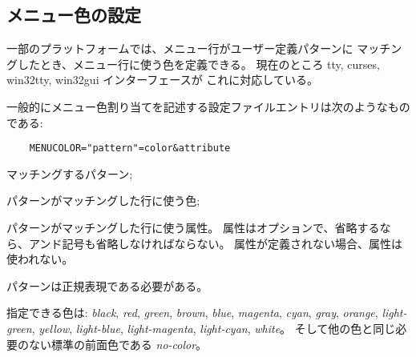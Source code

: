 
\subsection*{メニュー色の設定}

一部のプラットフォームでは、メニュー行がユーザー定義パターンに
マッチングしたとき、メニュー行に使う色を定義できる。
現在のところ tty, curses, win32tty, win32gui インターフェースが
これに対応している。

一般的にメニュー色割り当てを記述する設定ファイルエントリは次のようなものである:
\begin{verbatim}
    MENUCOLOR="pattern"=color&attribute
\end{verbatim}

\blist{}
\item[\ib{pattern}]
マッチングするパターン;
\item[\ib{color}]
パターンがマッチングした行に使う色;
\item[\ib{attribute}]
パターンがマッチングした行に使う属性。
属性はオプションで、省略するなら、アンド記号も省略しなければならない。
属性が定義されない場合、属性は使われない。
\elist

パターンは正規表現である必要がある。

指定できる色は:
{\it black}, {\it red}, {\it green}, {\it brown},
{\it blue}, {\it magenta}, {\it cyan}, {\it gray}, {\it orange},
{\it light-green}, {\it yellow}, {\it light-blue}, {\it light-magenta},
{\it light-cyan}, {\it white}。
そして他の色と同じ必要のない標準の前面色である {\it no-color}。

